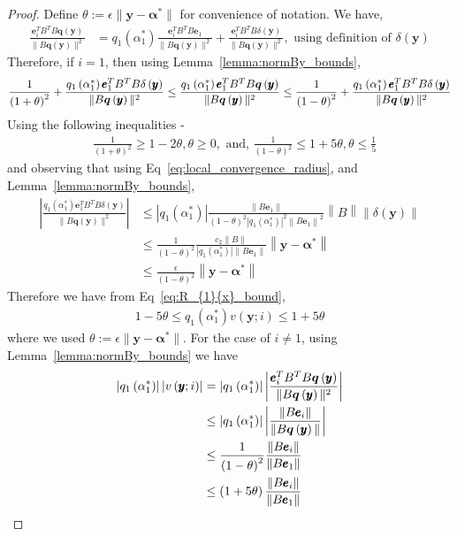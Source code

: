 \documentclass[letterpaper]{article}
\newcommand{\ba}[1]{\begin{align}#1\end{align}}
\newcommand{\bas}[1]{\begin{align*}#1\end{align*}}
\newcommand{\balpha}{\pmb{\alpha}}
\newcommand{\by}{\pmb{y}}
\newcommand{\be}{\pmb{e}}
\newcommand{\bb}[1]{\left(#1\right)}
\begin{document}
\begin{proof}
    Define $\theta := \epsilon\|\by-\balpha^{*}\|$ for convenience of notation. We have, 
    \ba{
        \frac{\be_{i}^{T}B^{T}B\bm{q}\bb{\by}}{\|B\bm{q}\bb{\by}\|^{2}} &= q_{1}\bb{\alpha^{*}_{1}}\frac{\be_{i}^{T}B^{T}B\be_{1}}{\|B\bm{q}\bb{\by}\|^{2}} + \frac{\be_{i}^{T}B^{T}B\delta\bb{\by}}{\|B\bm{q}\bb{\by}\|^{2}}, \text{ using definition of } \delta\bb{\by}
    }
    Therefore, if $i = 1$, then using Lemma~\ref{lemma:normBy_bounds},
    \ba{
        \frac{1}{\bb{1+\theta}^{2}} + \frac{q_{1}\bb{\alpha^{*}_{1}}\be_{1}^{T}B^{T}B\delta\bb{\by}}{\|B\bm{q}\bb{\by}\|^{2}} \leq \frac{q_{1}\bb{\alpha^{*}_{1}}\be_{1}^{T}B^{T}B\bm{q}\bb{\by}}{\|B\bm{q}\bb{\by}\|^{2}} \leq \frac{1}{\bb{1-\theta}^{2}} + \frac{q_{1}\bb{\alpha^{*}_{1}}\be_{1}^{T}B^{T}B\delta\bb{\by}}{\|B\bm{q}\bb{\by}\|^{2}}  \label{eq:R_{1}{x}_bound}
    }
    Using the following inequalities  -
    \bas{
        & \frac{1}{\bb{1+\theta}^{2}} \geq 1-2\theta, \theta \geq 0, \text{ and,  }\frac{1}{\bb{1-\theta}^{2}} \leq 1+5\theta, \theta \leq \frac{1}{5}
    }
    and observing that using Eq~\ref{eq:local_convergence_radius}, and Lemma~\ref{lemma:normBy_bounds}, 
    \bas{
    \left|\frac{q_{1}\bb{\alpha^{*}_{1}}\be_{1}^{T}B^{T}B\delta\bb{\by}}{\|B\bm{q}\bb{\by}\|^{2}}\right| &\leq \left|q_{1}\bb{\alpha^{*}_{1}}\right|\frac{\left\|B\be_{1}\right\|}{\bb{1-\theta}^{2}\left|q_{1}\bb{\alpha^{*}_{1}}\right|^{2}\left\|B\be_{1}\right\|^{2}}\left\|B\right\|\left\|\delta\bb{\by}\right\|  \\
    &\leq \frac{1}{\bb{1-\theta}^{2}}\frac{c_{2}\|B\|}{\left|q_{1}\bb{\alpha^{*}_{1}}\right|\|B\be_{1}\|}\left\|\by-\balpha^{*}\right\| \\
    &\leq \frac{\epsilon}{\bb{1-\theta}^{2}}\left\|\by-\balpha^{*}\right\|
    }
    Therefore we have from Eq~\ref{eq:R_{1}{x}_bound}, 
    \ba{
        1 - 5\theta \leq q_{1}\bb{\alpha^{*}_{1}}v\bb{\by;i} \leq 1 + 5\theta  \label{eq:R_i_bound_i_eq_1}
    }
    where we used $\theta := \epsilon\|\by-\balpha^{*}\|$. For the case of $i \neq 1$, using Lemma~\ref{lemma:normBy_bounds} we have
    \ba{
        \left|q_{1}\bb{\alpha^{*}_{1}}\right|\left|v\bb{\by;i}\right| &= \left|q_{1}\bb{\alpha^{*}_{1}}\right|\left|\frac{\be_{i}^{T}B^{T}B\bm{q}\bb{\by}}{\|B\bm{q}\bb{\by}\|^{2}}\right| \notag \\
        &\leq \left|q_{1}\bb{\alpha^{*}_{1}}\right|\left|\frac{\left\|B\be_{i}\right\|}{\|B\bm{q}\bb{\by}\|}\right| \notag \\
        &\leq \frac{1}{\bb{1-\theta}^{2}}\frac{\left\|B\be_{i}\right\|}{\|B\be_{1}\|} \notag \\
        &\leq \bb{1+5\theta}\frac{\left\|B\be_{i}\right\|}{\|B\be_{1}\|} \label{eq:R_i_bound_i_neq_1}
    }
\end{proof}
\end{document}
